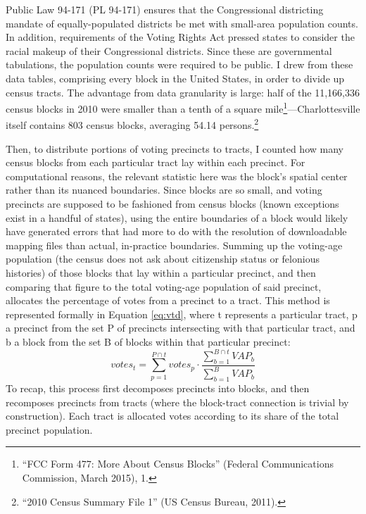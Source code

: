 \documentclass[12pt,oneside]{psthesis}
\begin{document}
Public Law 94-171 (PL 94-171) ensures that the Congressional districting mandate of equally-populated districts be met with small-area population counts.
In addition, requirements of the Voting Rights Act pressed states to consider the racial makeup of their Congressional districts.
Since these are governmental tabulations, the population counts were required to be public.
I drew from these data tables, comprising every block in the United States, in order to divide up census tracts.
The advantage from data granularity is large: half of the 11,166,336 census blocks in 2010 were smaller than a tenth of a square mile\footnote{``FCC Form 477: More About Census Blocks'' (Federal Communications Commission, March 2015), 1.}---Charlottesville itself contains 803 census blocks, averaging 54.14 persons.\footnote{``2010 Census Summary File 1'' (US Census Bureau, 2011).}

Then, to distribute portions of voting precincts to tracts, I counted how many census blocks from each particular tract lay within each precinct.
For computational reasons, the relevant statistic here was the block's spatial center rather than its nuanced boundaries.
Since blocks are so small, and voting precincts are supposed to be fashioned from census blocks (known exceptions exist in a handful of states), using the entire boundaries of a block would likely have generated errors that had more to do with the resolution of downloadable mapping files than actual, in-practice boundaries.
Summing up the voting-age population (the census does not ask about citizenship status or felonious histories) of those blocks that lay within a particular precinct, and then comparing that figure to the total voting-age population of said precinct, allocates the percentage of votes from a precinct to a tract.
This method is represented formally in Equation \eqref{eq:vtd}, where t represents a particular tract, p a precinct from the set P of precincts intersecting with that particular tract, and b a block from the set B of blocks within that particular precinct:
\begin{equation}
votes_{t} = \sum_{p=1}^{P \cap t} votes_p \cdot \frac{\sum_{b=1}^{B \cap t} VAP_b}{\sum_{b=1}^{B} VAP_b}
\label{eq:vtd}
\end{equation}
To recap, this process first decomposes precincts into blocks, and then recomposes precincts from tracts (where the block-tract connection is trivial by construction).
Each tract is allocated votes according to its share of the total precinct population.
\end{document}
